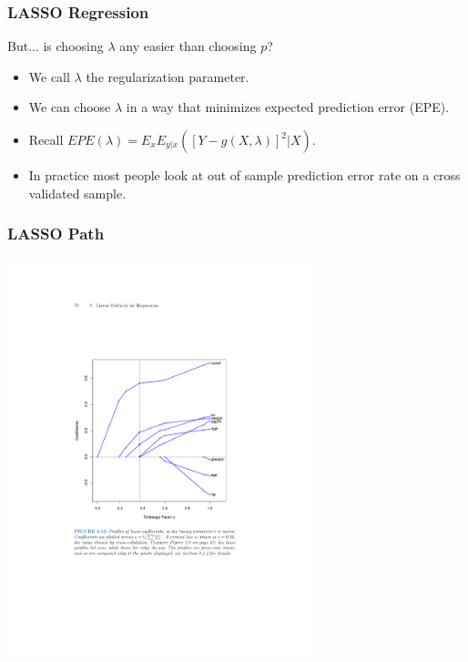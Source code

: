 \documentclass[xcolor=pdftex,dvipsnames,table,mathserif,aspectratio=169]{beamer}
\begin{document}
\begin{frame}
\frametitle{LASSO Regression}
But... is choosing $\lambda$ any easier than choosing $p$?
\begin{itemize}
\item We call $\lambda$ the \alert{regularization} parameter.
\item We can choose $\lambda$ in a way that minimizes expected prediction error (EPE).
\item Recall $EPE(\lambda) = E_x E_{y|x} ([ Y- g(X,\lambda)]^2 | X)$.
\item In practice most people look at out of sample prediction error rate on a \alert{cross validated sample}.
\end{itemize}
\end{frame}

\begin{frame}
\frametitle{LASSO Path}
\begin{center}
\includegraphics[width=3.5in]{./resources/lassopath}
\end{center}
\end{frame}
\end{document}
